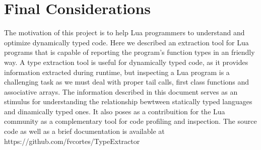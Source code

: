 \chapter{Final Considerations}
\label{cha:Final Considerations}
The motivation of this project is to help Lua programmers to understand and optimize dynamically typed code. Here we described an extraction tool for Lua programs that is capable of reporting the program's function types in an friendly way. A type extraction tool is useful for dynamically typed code, as it provides information extracted during runtime, but inspecting a Lua program is a challenging task as we must deal with proper tail calls, first class functions and associative arrays. The information described in this document serves as an stimulus for understanding the relationship bewtween statically typed languages and dinamically typed ones. It also poses as a contribuition for the Lua community as a complementary tool for code profiling and inspection.
    The source code as well as a brief documentation is available at https://github.com/fvcortes/TypeExtractor



% 